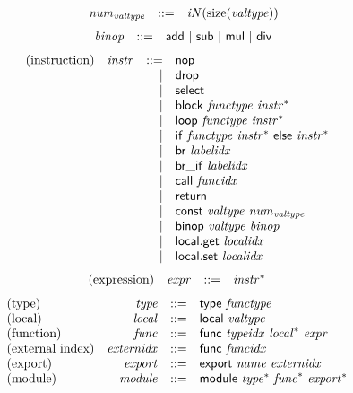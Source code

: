 \documentclass{article}
\begin{document}
$$
\begin{array}{@{}lrrl@{}l@{}}
& {{\mathit{num}}}_{{\mathit{valtype}}} &::=& {\mathit{iN}}({\mathrm{size}}({\mathit{valtype}})) \\
\end{array}
$$
$$
\begin{array}{@{}lrrl@{}l@{}}
& {\mathit{binop}} &::=& \mathsf{add} ~|~ \mathsf{sub} ~|~ \mathsf{mul} ~|~ \mathsf{div} \\
\end{array}
$$
$$
\begin{array}{@{}lrrl@{}l@{}}
\mbox{(instruction)} & {\mathit{instr}} &::=& \mathsf{nop} \\ &&|&
\mathsf{drop} \\ &&|&
\mathsf{select} \\ &&|&
\mathsf{block}~{\mathit{functype}}~{{\mathit{instr}}^\ast} \\ &&|&
\mathsf{loop}~{\mathit{functype}}~{{\mathit{instr}}^\ast} \\ &&|&
\mathsf{if}~{\mathit{functype}}~{{\mathit{instr}}^\ast}~\mathsf{else}~{{\mathit{instr}}^\ast} \\ &&|&
\mathsf{br}~{\mathit{labelidx}} \\ &&|&
\mathsf{br\_if}~{\mathit{labelidx}} \\ &&|&
\mathsf{call}~{\mathit{funcidx}} \\ &&|&
\mathsf{return} \\ &&|&
\mathsf{const}~{\mathit{valtype}}~{{\mathit{num}}}_{{\mathit{valtype}}} \\ &&|&
\mathsf{binop}~{\mathit{valtype}}~{\mathit{binop}} \\ &&|&
\mathsf{local.get}~{\mathit{localidx}} \\ &&|&
\mathsf{local.set}~{\mathit{localidx}} \\
\end{array}
$$
$$
\begin{array}{@{}lrrl@{}l@{}}
\mbox{(expression)} & {\mathit{expr}} &::=& {{\mathit{instr}}^\ast} \\
\end{array}
$$
$$
\begin{array}{@{}lrrl@{}l@{}}
\mbox{(type)} & {\mathit{type}} &::=& \mathsf{type}~{\mathit{functype}} \\
\mbox{(local)} & {\mathit{local}} &::=& \mathsf{local}~{\mathit{valtype}} \\
\mbox{(function)} & {\mathit{func}} &::=& \mathsf{func}~{\mathit{typeidx}}~{{\mathit{local}}^\ast}~{\mathit{expr}} \\
\mbox{(external index)} & {\mathit{externidx}} &::=& \mathsf{func}~{\mathit{funcidx}} \\
\mbox{(export)} & {\mathit{export}} &::=& \mathsf{export}~{\mathit{name}}~{\mathit{externidx}} \\
\mbox{(module)} & {\mathit{module}} &::=& \mathsf{module}~{{\mathit{type}}^\ast}~{{\mathit{func}}^\ast}~{{\mathit{export}}^\ast} \\
\end{array}
$$
\end{document}
